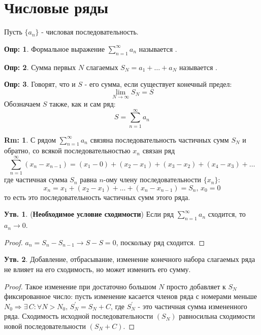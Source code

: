 \documentclass[12pt]{article}
\newcommand{\RN}[1]{%
	\textup{\uppercase\expandafter{\romannumeral#1}}%
}
\theoremstyle{definition}
\newtheorem{defn}{Опр:}
\newtheorem{rem}{Rm:}
\newtheorem{prop}{Утв.}
\newcommand{\ssum}[1]{\displaystyle \sum\limits_{n=1}^{\infty}{#1}_n}
\begin{document}
\lhead{Математический анализ - \RN{3}}
\section*{Числовые ряды}

Пусть $\{a_n\}$ - числовая последовательность.
\begin{defn}
	Формальное выражение $\ssum{a}$ называется .
\end{defn}
\begin{defn}
	Сумма первых $N$ слагаемых $S_N = a_1 + \dotsc + a_N$ называется .
\end{defn}
\begin{defn}
	Говорят, что  и $S$ - его сумма, если существует конечный предел: 
	$$
		\lim\limits_{N\to \infty}S_N = S
	$$
	Обозначаем $S$ также, как и сам ряд:
	$$
		S = \sum\limits_{n = 1}^{\infty}a_n
	$$
\end{defn}
\begin{rem}
	С рядом $\displaystyle \sum\limits_{n=1}^{\infty}a_n$ связяна последовательность частичных сумм $S_N$ и обратно, со всякой последовательностью $x_n$ связан ряд 
	$$
		\sum\limits_{n=1}^{\infty}(x_n - x_{n-1}) = (x_1 - 0) + (x_2 - x_1) + (x_3 - x_2) + (x_4 - x_3) + \dotsc 
	$$
	где частичная сумма $S_n$ равна $n$-ому члену последовательности $\{x_n\}$:
	$$
		x_n = x_1 + (x_2 - x_1) + \dotsc + (x_n - x_{n-1}) = S_n, \, x_0 = 0
	$$
	то есть это последовательность частичных сумм этого ряда.
\end{rem}

\begin{prop}(\textbf{Необходимое условие сходимости})
	Если ряд $\displaystyle \sum\limits_{n=1}^{\infty}a_n$ сходится, то $a_n \to 0$.
\end{prop}
\begin{proof}
	$a_n = S_n - S_{n-1} \to S - S = 0$, поскольку ряд сходится.
\end{proof}
\begin{prop}
	Добавление, отбрасывание, изменение конечного набора слагаемых ряда не влияет на его сходимость, но может изменить его сумму.
\end{prop}
\begin{proof}
	Такое изменение при достаточно большом $N$ просто добавляет к $S_N$ фиксированное число: пусть изменение касается членов ряда с номерами меньше $N_0 \Rightarrow \exists \, C \colon \forall N > N_0, \, S_N^\prime = S_N + C$, где $S_N^\prime$ - это частичная сумма измененного ряда. Сходимость исходной последовательности $(S_N)$ равносильна сходимости новой последовательности $(S_N + C)$.
\end{proof}
\end{document}
